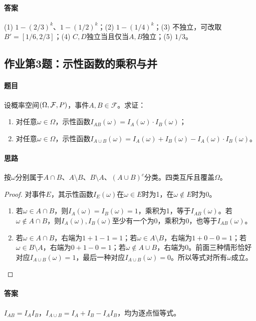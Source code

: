 \paragraph{答案}(1) $1-(2/3)^k$、$1-(1/2)^k$；(2) $1-(1/4)^k$；(3) 不独立，可改取$B'=[1/6,2/3]$；(4) $C,D$独立当且仅当$A,B$独立；(5) $1/3$。

\subsection{作业第3题：示性函数的乘积与并}
\label{ex:w05-h3}
\paragraph{题目}
设概率空间$(\Omega,\mathcal F,\P)$，事件$A,B\in\mathcal F$。求证：
\begin{enumerate}
\item 对任意$\omega\in\Omega$，示性函数$I_{AB}(\omega)=I_A(\omega)\cdot I_B(\omega)$；
\item 对任意$\omega\in\Omega$，示性函数$I_{A\cup B}(\omega)=I_A(\omega)+I_B(\omega)-I_A(\omega)\cdot I_B(\omega)$。
\end{enumerate}
\paragraph{思路}按$\omega$分别属于$A\cap B$、$A\setminus B$、$B\setminus A$、$(A\cup B)^c$分类。四类互斥且覆盖$\Omega$。
\begin{proof}
对事件$E$，其示性函数$I_E(\omega)$在$\omega\in E$时为1，在$\omega\notin E$时为0。
\begin{enumerate}
\item 若$\omega\in A\cap B$，则$I_A(\omega)=I_B(\omega)=1$，乘积为1，等于$I_{AB}(\omega)$。若$\omega\notin A\cap B$，则$I_A(\omega),I_B(\omega)$至少有一个为0，乘积为0，也等于$I_{AB}(\omega)$。
\item 若$\omega\in A\cap B$，右端为$1+1-1=1$；若$\omega\in A\setminus B$，右端为$1+0-0=1$；若$\omega\in B\setminus A$，右端为$0+1-0=1$；若$\omega\notin A\cup B$，右端为0。前面三种情形恰好对应$I_{A\cup B}(\omega)=1$，最后一种对应$I_{A\cup B}(\omega)=0$。所以等式对所有$\omega$成立。
\end{enumerate}
\end{proof}
\paragraph{答案}$I_{AB}=I_AI_B$，$I_{A\cup B}=I_A+I_B-I_AI_B$，均为逐点恒等式。


